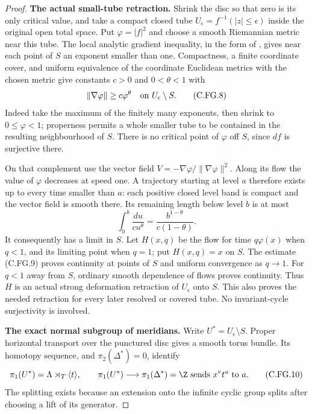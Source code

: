 \begin{proof}
\par\medskip\noindent\textbf{The actual small-tube retraction.}
Shrink the disc so that zero is its only critical value, and take
a compact closed tube $U_\epsilon=f^{-1}(|z|\le\epsilon)$ inside
the original open total space. Put $\varphi=|f|^2$ and choose a
smooth Riemannian metric near this tube. The local analytic gradient
inequality, in the form of
\cite[Theorem (LI), p.~775]{Kurdyka1998}, gives near each point of
$S$ an exponent smaller than one. Compactness, a finite coordinate
cover, and uniform equivalence of the coordinate Euclidean metrics
with the chosen metric give constants $c>0$ and $0<\theta<1$ with
\[
                 \|\nabla\varphi\|\ge c\varphi^\theta
                   \quad\hbox{on }U_\epsilon\setminus S.
                                                        \tag{C.FG.8}
\]
Indeed take the maximum of the finitely many exponents, then shrink
to $0\le\varphi<1$; properness permits a whole smaller tube to be
contained in the resulting neighbourhood of $S$. There is no
critical point of $\varphi$ off $S$, since $df$ is surjective there.

On that complement use the vector field
$V=-\nabla\varphi/\|\nabla\varphi\|^2$. Along its flow the value
of $\varphi$ decreases at speed one. A trajectory starting at level
$a$ therefore exists up to every time smaller than $a$: each
positive closed level band is compact and the vector field is
smooth there. Its remaining length below level $b$ is at most
\[
          \int_0^b\frac{du}{c u^\theta}
                 =\frac{b^{1-\theta}}{c(1-\theta)}.    \tag{C.FG.9}
\]
It consequently has a limit in $S$. Let $H(x,q)$ be the flow for
time $q\varphi(x)$ when $q<1$, and its limiting point when $q=1$;
put $H(x,q)=x$ on $S$. The estimate (C.FG.9) proves continuity
at points of $S$ and uniform convergence as $q\to1$. For $q<1$
away from $S$, ordinary smooth dependence of flows proves
continuity. Thus $H$ is an actual strong deformation retraction
of $U_\epsilon$ onto $S$. This also proves the needed retraction
for every later resolved or covered tube. No invariant-cycle
surjectivity is involved.

\par\medskip\noindent\textbf{The exact normal subgroup of meridians.}
Write $U^*=U_\epsilon\setminus S$. Proper horizontal transport
over the punctured disc gives a smooth torus bundle. Its homotopy
sequence, and $\pi_2(\Delta^*)=0$, identify
\[
       \pi_1(U^*)=\Lambda\rtimes_T\langle t\rangle,
       \qquad \pi_1(U^*)\longrightarrow\pi_1(\Delta^*)=\Z
       \text{ sends }x^v t^a\text{ to }a .             \tag{C.FG.10}
\]
The splitting exists because an extension onto the infinite cyclic
group splits after choosing a lift of its generator.


\end{proof}
